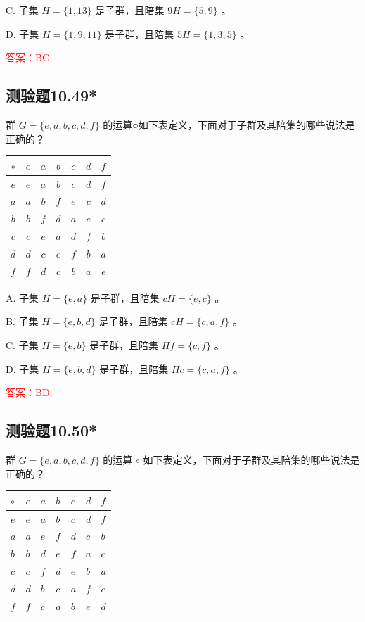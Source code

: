 \documentclass[UTF8, heading=true]{ctexart}
\begin{document}
C. 子集 ${H}=\{1,13\}$ 是子群，且陪集 $9 {H}=\{5,9\}$ 。

D. 子集 ${H}=\{1,9,11\}$ 是子群，且陪集 $5 {H}=\{1,3,5\}$ 。

\textcolor{red}{答案：BC}

\subsection{测验题10.49*}

群 $G=\{e, a, b, c, d, f\}$ 的运算○如下表定义，下面对于子群及其陪集的哪些说法是正确的？

\begin{table}[H]
  \renewcommand{\arraystretch}{1.5}
  \centering
\begin{tabular}{c|cccccc}
\hline$\circ$ & $e$ & $a$ & $b$ & $c$ & $d$ & $f$ \\
\hline$e$ & $e$ & $a$ & $b$ & $c$ & $d$ & $f$ \\
$a$ & $a$ & $b$ & $f$ & $e$ & $c$ & $d$ \\
$b$ & $b$ & $f$ & $d$ & $a$ & $e$ & $c$ \\
$c$ & $c$ & $e$ & $a$ & $d$ & $f$ & $b$ \\
$d$ & $d$ & $c$ & $e$ & $f$ & $b$ & $a$ \\
$f$ & $f$ & $d$ & $c$ & $b$ & $a$ & $e$ \\
\hline
\end{tabular}
\end{table}

A. 子集 $H=\{e, a\}$ 是子群，且陪集 $c H=\{e, c\}$ 。

B. 子集 $H=\{e, b, d\}$ 是子群，且陪集 $c H=\{c, a, f\}$ 。

C. 子集 $H=\{e, b\}$ 是子群，且陪集 $H f=\{c, f\}$ 。

D. 子集 $H=\{e, b, d\}$ 是子群，且陪集 $H c=\{c, a, f\}$ 。

\textcolor{red}{答案：BD}

\subsection{测验题10.50*}

群 $G=\{e, a, b, c, d, f\}$ 的运算 $\circ$ 如下表定义，下面对于子群及其陪集的哪些说法是正确的？
\begin{table}[H]
  \renewcommand{\arraystretch}{1.5}
  \centering
\begin{tabular}{l|llllll}
\hline$\circ$ & $e$ & $a$ & $b$ & $c$ & $d$ & $f$ \\
\hline$e$ & $e$ & $a$ & $b$ & $c$ & $d$ & $f$ \\
$a$ & $a$ & $e$ & $f$ & $d$ & $c$ & $b$ \\
$b$ & $b$ & $d$ & $e$ & $f$ & $a$ & $c$ \\
$c$ & $c$ & $f$ & $d$ & $e$ & $b$ & $a$ \\
$d$ & $d$ & $b$ & $c$ & $a$ & $f$ & $e$ \\
$f$ & $f$ & $c$ & $a$ & $b$ & $e$ & $d$ \\
\hline
\end{tabular}
\end{table}
\end{document}
